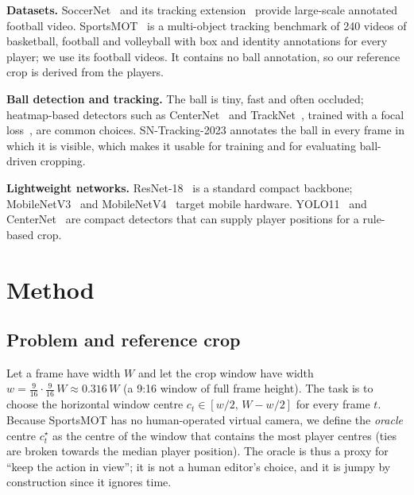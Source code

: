 \documentclass[conference]{IEEEtran}
\begin{document}
\textbf{Datasets.} SoccerNet~\cite{giancola2018} and its tracking extension~\cite{cioppa2022} provide large-scale annotated football video. SportsMOT~\cite{cui2023} is a multi-object tracking benchmark of 240 videos of basketball, football and volleyball with box and identity annotations for every player; we use its football videos. It contains no ball annotation, so our reference crop is derived from the players.

\textbf{Ball detection and tracking.} The ball is tiny, fast and often occluded; heatmap-based detectors such as CenterNet~\cite{zhou2019} and TrackNet~\cite{huang2019}, trained with a focal loss~\cite{lin2017}, are common choices. SN-Tracking-2023 annotates the ball in every frame in which it is visible, which makes it usable for training and for evaluating ball-driven cropping.

\textbf{Lightweight networks.} ResNet-18~\cite{he2016} is a standard compact backbone; MobileNetV3~\cite{howard2019} and MobileNetV4~\cite{qin2024} target mobile hardware. YOLO11~\cite{yolo11} and CenterNet~\cite{zhou2019} are compact detectors that can supply player positions for a rule-based crop.

\section{Method}
\subsection{Problem and reference crop}
Let a frame have width $W$ and let the crop window have width $w=\tfrac{9}{16}\cdot\tfrac{9}{16}\,W\approx0.316\,W$ (a 9:16 window of full frame height). The task is to choose the horizontal window centre $c_t\in[w/2,\,W-w/2]$ for every frame $t$. Because SportsMOT has no human-operated virtual camera, we define the \emph{oracle} centre $c^\star_t$ as the centre of the window that contains the most player centres (ties are broken towards the median player position). The oracle is thus a proxy for ``keep the action in view''; it is not a human editor's choice, and it is jumpy by construction since it ignores time.
\end{document}
